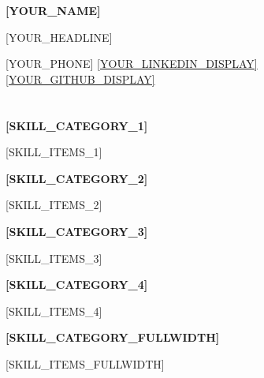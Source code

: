 \documentclass[10pt,a4paper]{article}
\newcommand{\skillrow}[4]{\noindent
  \begin{minipage}[t]{0.48\linewidth}
    {\fontsize{9}{11}\selectfont\bfseries #1}\par
    {\fontsize{8.5}{11}\selectfont\color{graytext}#2}
  \end{minipage}\hfill
  \begin{minipage}[t]{0.48\linewidth}
    {\fontsize{9}{11}\selectfont\bfseries #3}\par
    {\fontsize{8.5}{11}\selectfont\color{graytext}#4}
  \end{minipage}\par\vspace{8pt}}
\begin{document}
\thispagestyle{empty}

\noindent
{\fontsize{22}{24}\selectfont\bfseries [YOUR_NAME]}\par
\vspace{2pt}
{\fontsize{11}{13}\selectfont\color{accent}[YOUR_HEADLINE]}\par
\vspace{4pt}
{\fontsize{8.5}{11}\selectfont\color{graytext}%
 [YOUR_PHONE]   \quad
 \href{[YOUR_LINKEDIN_URL]}{\color{accent}[YOUR_LINKEDIN_DISPLAY]} \quad
 \href{[YOUR_GITHUB_URL]}{\color{accent}[YOUR_GITHUB_DISPLAY]}\\
 [YOUR_WORK_AUTH_NOTE]}

\vspace{6pt}
\noindent{\color{accent}\rule{\linewidth}{1.2pt}}
\vspace{10pt}\par

\section{}
{\fontsize{9.5}{13}}

\section{}
\skillrow{[SKILL_CATEGORY_1]}{[SKILL_ITEMS_1]}{[SKILL_CATEGORY_2]}{[SKILL_ITEMS_2]}
\skillrow{[SKILL_CATEGORY_3]}{[SKILL_ITEMS_3]}{[SKILL_CATEGORY_4]}{[SKILL_ITEMS_4]}
{\fontsize{9}{11}\selectfont\bfseries [SKILL_CATEGORY_FULLWIDTH]}\par
{\fontsize{8.5}{11}\selectfont\color{graytext}[SKILL_ITEMS_FULLWIDTH]}

\end{document}
